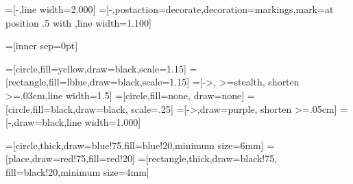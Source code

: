 =[-,line width=2.000]
=[-,postaction={decorate},decoration={markings,mark=at position .5 with {\arrow{>}}},line width=1.100]

=[inner sep=0pt]

=[circle,fill=yellow,draw=black,scale=1.15]
=[rectangle,fill=lblue,draw=black,scale=1.15]
=[->, >=stealth, shorten >=.03cm,line width=1.5]
=[circle,fill=none, draw=none]
=[circle,fill=black,draw=black, scale=.25]
=[->,draw=purple, shorten >=.05cm]
=[-,draw=black,line width=1.000]


\def\xcolorversion{2.00}
\def\xkeyvalversion{1.8}
\usetikzlibrary{arrows,shapes,decorations,automata,backgrounds,petri}
=[circle,thick,draw=blue!75,fill=blue!20,minimum size=6mm]
=[place,draw=red!75,fill=red!20]
=[rectangle,thick,draw=black!75,
  			  fill=black!20,minimum size=4mm]


\newcommand{\inv}{^{-1}}

\newcommand{\Int}{\textstyle{\int}}

\newcommand{\Kl}{\mathsf{Kl}}
\newcommand{\Khat}{\widehat K}